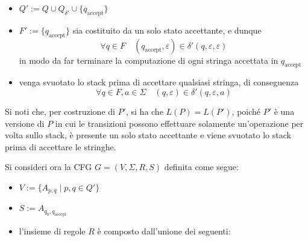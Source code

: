 \documentclass[a4paper, 12pt]{report}
\begin{document}
{\begin{itemize}
\begin{figure}[H]
                \end{figure}

                e sia $Q_{\delta'}$ l'insieme di stati tali da permettere la non simultaneità appena descritta
            \item $Q' := Q \cup Q_{\delta '} \cup \{q_\mathrm{accept}\}$
            \item $F' := \{q_\mathrm{accept}\}$ sia costituito da un solo stato accettante, e dunque $$\forall q \in F \quad (q_\mathrm{accept}, \varepsilon) \in \delta'(q, \varepsilon, \varepsilon)$$ in modo da far terminare la computazione di ogni stringa accettata in $q_\mathrm{accept}$
            \item venga svuotato lo stack prima di accettare qualsiasi stringa, di conseguenza $$\forall q \in F, a \in \Sigma \quad (q, \varepsilon) \in \delta'(q, \varepsilon, a)$$
        \end{itemize}

        Si noti che, per costruzione di $P'$, si ha che $L(P) = L(P')$, poiché $P'$ è una versione di $P$ in cui le transizioni possono effettuare solamente un'operazione per volta sullo stack, è presente un solo stato accettante e viene svuotato lo stack prima di accettare le stringhe.

        Si consideri ora la CFG $G = (V, \Sigma, R, S)$ definita come segue:

        \begin{itemize}
            \item $V := \{A_{p,q} \mid p, q \in Q'\}$
            \item $S := A_{q_0, q_\mathrm{accept}}$
            \item l'insieme di regole $R$ è composto dall'unione dei seguenti: 
        \end{itemize}

}
\end{document}
